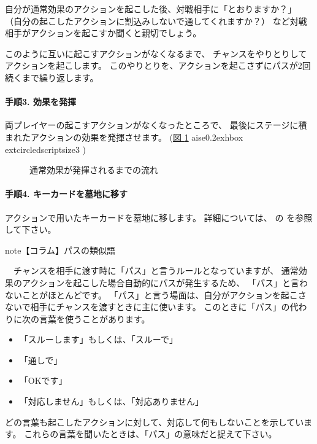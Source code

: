\documentclass[letterpaper,10pt,dvipdfmx]{sphinxmanual}
\begin{document}
自分が通常効果のアクションを起こした後、対戦相手に「とおりますか？」
（自分の起こしたアクションに割込みしないで通してくれますか？）
など対戦相手がアクションを起こすか聞くと親切でしょう。

このように互いに起こすアクションがなくなるまで、
チャンスをやりとりしてアクションを起こします。
このやりとりを、アクションを起こさずにパスが2回続くまで繰り返します。


\paragraph{手順3. 効果を発揮}
\label{\detokenize{common/03-action:id29}}
両プレイヤーの起こすアクションがなくなったところで、
最後にステージに積まれたアクションの効果を発揮させます。
(\hyperref[\detokenize{common/03-action:action-begin}]{図 \ref{\detokenize{common/03-action:action-begin}}} 
aise0.2exhbox{	extcircled{scriptsize{3}}} )

\begin{figure}[htbp]
\centering
\capstart

\noindent{}
\caption{通常効果が発揮されるまでの流れ}\label{\detokenize{common/03-action:id37}}\label{\detokenize{common/03-action:action-begin}}\end{figure}


\paragraph{手順4. キーカードを墓地に移す}
\label{\detokenize{common/03-action:id30}}
アクションで用いたキーカードを墓地に移します。
詳細については、
{\hyperref[\detokenize{common/03-action:action-exe}]{}} の
{\hyperref[\detokenize{common/03-action:keycard-gy}]{}}
を参照して下さい。

\begin{sphinxadmonition}{note}{【コラム】パスの類似語}

　チャンスを相手に渡す時に「パス」と言うルールとなっていますが、
通常効果のアクションを起こした場合自動的にパスが発生するため、
「パス」と言わないことがほとんどです。
「パス」と言う場面は、自分がアクションを起こさないで相手にチャンスを渡すときに主に使います。
このときに「パス」の代わりに次の言葉を使うことがあります。
\begin{itemize}
\item {} 
「スルーします」もしくは、「スルーで」

\item {} 
「通しで」

\item {} 
「OKです」

\item {} 
「対応しません」もしくは、「対応ありません」

\end{itemize}

どの言葉も起こしたアクションに対して、対応して何もしないことを示しています。
これらの言葉を聞いたときは、「パス」の意味だと捉えて下さい。
\end{sphinxadmonition}
\end{document}
